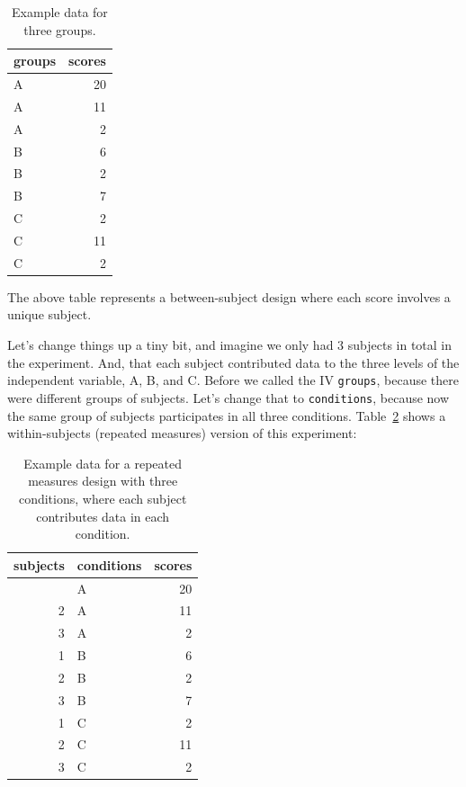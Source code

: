 \documentclass[
  letterpaper,
  DIV=11,
  numbers=noendperiod]{scrreprt}
\begin{document}
\begin{longtable}[]{@{}lr@{}}

\caption{\label{tbl-8rmdata1}Example data for three groups.}

\tabularnewline

\toprule\noalign{}
groups & scores \\
\midrule\noalign{}
\endhead
\bottomrule\noalign{}
\endlastfoot
A & 20 \\
A & 11 \\
A & 2 \\
B & 6 \\
B & 2 \\
B & 7 \\
C & 2 \\
C & 11 \\
C & 2 \\

\end{longtable}

The above table represents a between-subject design where each score
involves a unique subject.

Let's change things up a tiny bit, and imagine we only had 3 subjects in
total in the experiment. And, that each subject contributed data to the
three levels of the independent variable, A, B, and C. Before we called
the IV \texttt{groups}, because there were different groups of subjects.
Let's change that to \texttt{conditions}, because now the same group of
subjects participates in all three conditions. Table~\ref{tbl-8rmdata2}
shows a within-subjects (repeated measures) version of this experiment:

\begin{longtable}[]{@{}rlr@{}}

\caption{\label{tbl-8rmdata2}Example data for a repeated measures design
with three conditions, where each subject contributes data in each
condition.}

\tabularnewline

\toprule\noalign{}
subjects & conditions & scores \\
\midrule\noalign{}
\endhead
\bottomrule\noalign{}
\endlastfoot
1 & A & 20 \\
2 & A & 11 \\
3 & A & 2 \\
1 & B & 6 \\
2 & B & 2 \\
3 & B & 7 \\
1 & C & 2 \\
2 & C & 11 \\
3 & C & 2 \\

\end{longtable}
\end{document}
